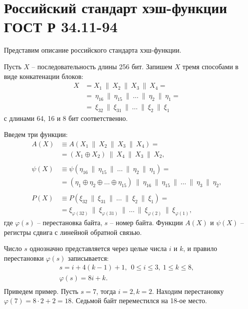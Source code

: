 \section{Российский стандарт хэш-функции ГОСТ Р 34.11-94}

Представим описание российского стандарта хэш-функции.

Пусть $X$ -- последовательность длины 256 бит. Запишем $X$ тремя способами в виде конкатенации блоков:
\[ \begin{array}{ll}
    X & = X_1 ~\|~ X_2 ~\|~ X_3 ~\|~ X_4 = \\
    & = ~ \eta_{16} ~\|~ \eta_{15} ~\|~ \dots ~\|~ \eta_2 ~\|~ \eta_1 = \\
    & = ~ \xi_{32} ~\|~ \xi_{31} ~\|~ \dots ~\|~ \xi_2 ~\|~ \xi_1
\end{array} \]
с длинами 64, 16 и 8 бит соответственно.

Введем три функции:
\[ \begin{array}{ll}
    A(X) & \equiv A(X_1 ~\|~ X_2 ~\|~ X_3 ~\|~ X_4) = \\
        & = \left( X_1 \oplus X_2 \right) ~\|~ X_4 ~\|~ X_3 ~\|~ X_2, \\
    & \\
    \psi(X) & \equiv \psi(\eta_{16} ~\|~ \eta_{15} ~\|~ \dots ~\|~ \eta_2 ~\|~ \eta_1) = \\
        & = \left( \eta_1 \oplus \eta_2 \oplus \dots \oplus \eta_{15} \right) ~\|~
            \eta_{16} ~\|~ \eta_{15} ~\|~ \dots ~\|~ \eta_3 ~\|~ \eta_2, \\
    & \\
    P(X) & \equiv P(\xi_{32} ~\|~ \xi_{31} ~\|~ \dots ~\|~ \xi_2 ~\|~ \xi_1) = \\
        & = \xi_{\varphi(32)} ~\|~ \xi_{\varphi(31)} ~\|~ \dots ~\|~ \xi_{\varphi(2)} ~\|~ \xi_{\varphi(1)},
\end{array} \]
где $\varphi(s)$ -- перестановка байта, $s$ -- номер байта. Функции $A(X)$ и $\psi(X)$ -- регистры сдвига с линейной обратной связью.

Число $s$ однозначно представляется через целые числа $i$ и $k$, и правило перестановки $\varphi(s)$ записывается:
\[ \begin{array}{c}
    s = i + 4 (k - 1) + 1, ~~ 0 \le i \le 3, ~ 1 \le k \le 8, \\
    \varphi(s) = 8 i + k. \\
\end{array} \]
Приведем пример. Пусть $s = 7$, тогда $i=2, k=2$. Находим перестановку $\varphi(7) = 8 \cdot 2 + 2 = 18$. Седьмой байт переместился на 18-ое место.

